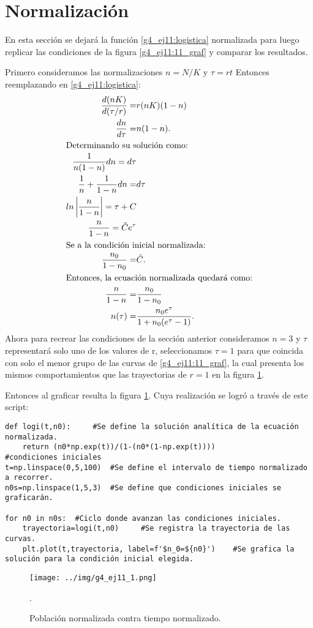 \documentclass[../portafolio.tex]{subfiles}
\begin{document}
\section{Normalización}
En esta sección se dejará la función \eqref{g4_ej11:logistica} normalizada para luego replicar las condiciones de la figura \ref{g4_ej11:11_graf} y comparar los resultados.

Primero consideramos las normalizaciones $n=N/K$ y $\tau=rt$ Entonces reemplazando en \eqref{g4_ej11:logistica}:
\begin{align}
\frac{d(nK)}{d(\tau /r)}=& r(nK)(1-n)\\
\frac{dn}{d\tau}=& n(1-n). \label{g4_ej11:norma}\\ \intertext{Determinando su solución como:}
\frac{1}{n(1-n)}dn=d\tau \\
\frac{1}{n}+\frac{1}{1-n}dn=&d\tau\\
ln\left|\frac{n}{1-n}\right| = \tau + C\\
\frac{n}{1-n}= \tilde{C} e^{\tau}\\ \intertext{Se a la condición inicial normalizada:}
\frac{n_0}{1-n_0}=&\tilde{C}.\\ \intertext{Entonces, la ecuación normalizada quedará como:}
\frac{n}{1-n}=&\frac{n_0}{1-n_0}\\
n(\tau)=& \frac{n_0e^{\tau}}{1+n_0(e^{\tau}-1)}.
\end{align}
Ahora para recrear las condiciones de la sección anterior consideramos $n=3$ y $\tau$ representará solo uno de los valores de r, seleccionamos $\tau=1$ para que coincida con solo el menor grupo de las curvas de \ref{g4_ej11:11_graf}, la cual presenta los mismos comportamientos que las trayectorias de $r=1$ en la figura \ref{g4_ej11:11_graf_1}.

Entonces al graficar resulta la figura \ref{g4_ej11:11_graf_1}. Cuya realización se logró a través de este script:
\begin{verbatim}
def logi(t,n0):     #Se define la solución analítica de la ecuación normalizada.
    return (n0*np.exp(t))/(1-(n0*(1-np.exp(t))))
#condiciones iniciales
t=np.linspace(0,5,100)  #Se define el intervalo de tiempo normalizado a recorrer.
n0s=np.linspace(1,5,3)  #Se define que condiciones iniciales se graficarán.

for n0 in n0s:  #Ciclo donde avanzan las condiciones iniciales.
    trayectoria=logi(t,n0)     #Se registra la trayectoria de las curvas.
    plt.plot(t,trayectoria, label=f'$n_0=${n0}')    #Se grafica la solución para la condición inicial elegida.
\end{verbatim}
\begin{figure}
\centering
\texttt{[image: ../img/g4\_ej11\_1.png]} 
\caption{Población normalizada contra tiempo normalizado. }\label{g4_ej11:11_graf_1}.
\end{figure}
\end{document}
